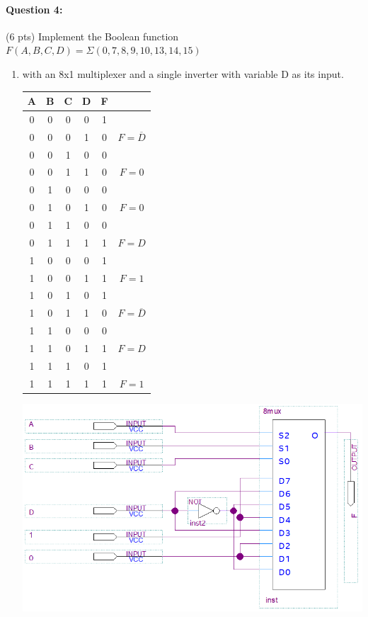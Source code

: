\documentclass[12pt,letterpaper,titlepage]{report}
\begin{document}
\begin{raggedright}
\paragraph{Question 4:}
(6 pts) Implement the Boolean function $F(A,B,C,D) = \Sigma(0,7,8,9,10,13,14,15)$
\begin{enumerate} [label=\alph*)]
\item with an 8x1 multiplexer and a single inverter with variable D as its input.
\begin{paracol}{2}
\def\arraystretch{1.1} 
\begin{tabular}{|cccc|cc|}\hline 
A & B & C & D & F& \\ \hline
0 & 0 & 0 & 0 & 1& \\ 
0 & 0 & 0 & 1 & 0&$F=\overline{D}$ \\ \hline
0 & 0 & 1 & 0 & 0& \\ 
0 & 0 & 1 & 1 & 0&$F=0$ \\ \hline
0 & 1 & 0 & 0 & 0& \\ 
0 & 1 & 0 & 1 & 0&$F=0$ \\ \hline 
0 & 1 & 1 & 0 & 0& \\  
0 & 1 & 1 & 1 & 1&$F=D$ \\ \hline
1 & 0 & 0 & 0 & 1& \\ 
1 & 0 & 0 & 1 & 1&$F=1$ \\ \hline 
1 & 0 & 1 & 0 & 1& \\  
1 & 0 & 1 & 1 & 0&$F=\overline{D}$ \\ \hline 
1 & 1 & 0 & 0 & 0& \\  
1 & 1 & 0 & 1 & 1&$F=D$ \\ \hline
1 & 1 & 1 & 0 & 1& \\ 
1 & 1 & 1 & 1 & 1&$F=1$ \\ \hline
\end{tabular} 
\switchcolumn
\includegraphics[width=0.9\columnwidth, height=\textheight, keepaspectratio=true]{hw6p4a}

\end{paracol}
\end{enumerate}
\end{raggedright}
\end{document}

